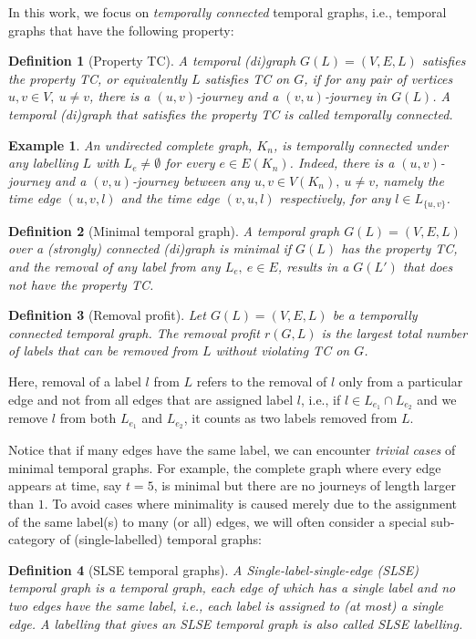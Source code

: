 \documentclass[a4paper,UKenglish]{article}
\newtheorem{definition}{Definition}
\newtheorem*{example*}{Example}
\begin{document}
In this work, we focus on \emph{temporally connected} temporal graphs, i.e., temporal graphs that have the following property:
\begin{definition}[Property TC]
A temporal (di)graph $G(L) = (V,E,L)$ satisfies the property TC, or equivalently $L$ satisfies TC on $G$, if for any pair of vertices $u,v \in V,~u\not=v$, there is a $(u,v)$-journey \emph{and} a $(v,u)$-journey in $G(L)$. A temporal (di)graph that satisfies the property TC is called \emph{temporally connected}.
\end{definition}
\begin{example*}
An undirected complete graph, $K_n$, is temporally connected under any labelling $L$ with $L_e\not= \emptyset$ for every $e \in E(K_n)$. Indeed, there is a $(u,v)$-journey and a $(v,u)$-journey between any $u,v\in V(K_n),~u\not=v$, namely the time edge $(u,v,l)$ and the time edge $(v,u,l)$ respectively, for any $l \in L_{\{u,v\}}$.
\end{example*}

\begin{definition}[Minimal temporal graph]
A temporal graph $G(L)=(V,E,L)$ over a (strongly) connected (di)graph is \emph{minimal} if $G(L)$ has the property TC, and the removal of any label from any $L_e,~e\in E$, results in a $G(L')$ that \emph{does not} have the property TC.
\end{definition}
\begin{definition}[Removal profit]
Let $G(L)=(V,E,L)$ be a temporally connected temporal graph. The \emph{removal profit} $r(G,L)$ is the largest total number of labels that can be removed from $L $ without violating TC on $G$.
\end{definition}
Here, removal of a label $l$ from $L$ refers to the removal of $l$ only from a particular edge and not from all edges that are assigned label $l$, i.e., if $l \in L_{e_1} \cap L_{e_2}$ and we remove $l$ from both $L_{e_1}$ and $L_{e_2}$, it counts as two labels removed from $L$.


Notice that if many edges have the same label, we can encounter \emph{trivial cases} of minimal temporal graphs. For example, the complete graph where every edge appears at time, say $t=5$, is minimal but there are no journeys of length larger than $1$. To avoid cases where minimality is caused merely due to the assignment of the same label(s) to many (or all) edges, we will often consider a special sub-category of (single-labelled) temporal graphs:
\begin{definition}[SLSE temporal graphs]
A Single-label-single-edge (SLSE) temporal graph is a temporal graph, each edge of which has a single label and no two edges have the same label, i.e., each label is assigned to (at most) a single edge. A labelling that gives an SLSE temporal graph is also called \emph{SLSE labelling}.
\end{definition}
\end{document}
